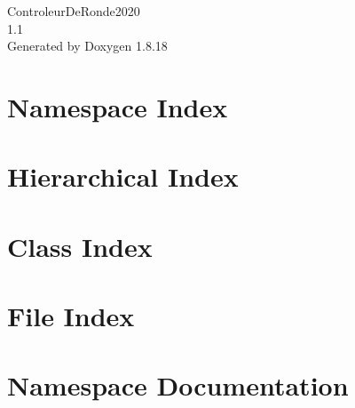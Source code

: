 \let\mypdfximage\pdfximage\def\pdfximage{\immediate\mypdfximage}\documentclass[twoside]{book}
\newcommand{\+}{\discretionary{\mbox{\scriptsize$\hookleftarrow$}}{}{}}
\newcommand{\clearemptydoublepage}{%
  \newpage{\pagestyle{empty}\cleardoublepage}%
}
\begin{document}
\hypersetup{pageanchor=false,
             bookmarksnumbered=true,
             pdfencoding=unicode
            }
\begin{titlepage}
\vspace*{7cm}
\begin{center}%
{\Large Controleur\+De\+Ronde2020 \\[1ex]\large 1.\+1 }\\
\vspace*{1cm}
{\large Generated by Doxygen 1.8.18}\\
\end{center}
\end{titlepage}
\clearemptydoublepage
{}
\tableofcontents
\clearemptydoublepage
{}
\hypersetup{pageanchor=true}

\chapter{Namespace Index}

\chapter{Hierarchical Index}

\chapter{Class Index}

\chapter{File Index}

\chapter{Namespace Documentation}

\end{document}
